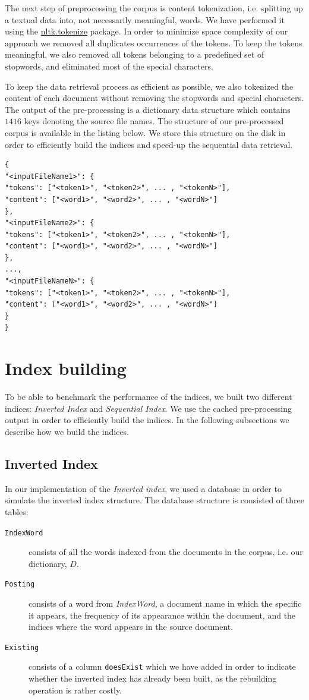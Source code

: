 \documentclass{article}
\begin{document}
The next step of preprocessing the corpus is content tokenization, i.e. splitting up a textual data into, not necessarily meaningful, words. We have performed it using the \href{https://www.nltk.org/}{nltk.tokenize} package. In order to minimize space complexity of our approach we removed all duplicates occurrences of the tokens. To keep the tokens meaningful, we also removed all tokens belonging to a predefined set of stopwords, and eliminated most of the special characters.

To keep the data retrieval process as efficient as possible, we also tokenized the content of each document without removing the stopwords and special characters. The output of the pre-processing is a dictionary data structure which contains $1416$ keys denoting the source file names. The structure of our pre-processed corpus is available in the listing below. We store this structure on the disk in order to efficiently build the indices and speed-up the sequential data retrieval.

\begin{verbatim}
{
"<inputFileName1>": {
"tokens": ["<token1>", "<token2>", ... , "<tokenN>"],
"content": ["<word1>", "<word2>", ... , "<wordN>"]
},
"<inputFileName2>": {
"tokens": ["<token1>", "<token2>", ... , "<tokenN>"],
"content": ["<word1>", "<word2>", ... , "<wordN>"]
},
...,
"<inputFileNameN>": {
"tokens": ["<token1>", "<token2>", ... , "<tokenN>"],
"content": ["<word1>", "<word2>", ... , "<wordN>"]
}
}
\end{verbatim}

\section{Index building}
To be able to benchmark the performance of the indices, we built two different indices: \textit{Inverted Index} and \textit{Sequential Index}. 
We use the cached pre-processing output in order to efficiently build the indices. In the following subsections we describe how we build the indices.

\subsection{Inverted Index}
In our implementation of the \textit{Inverted index}, we used a database in order to simulate the inverted index structure. The database structure is consisted of three tables:
\begin{description}
	\item[\texttt{IndexWord}] consists of all the words indexed from the documents in the corpus, i.e. our dictionary, $D$.
	\item[\texttt{Posting}] consists of a word from \textit{IndexWord}, a document name in which the specific it appears, the frequency of its appearance within the document, and the indices where the word appears in the source document.
	\item[\texttt{Existing}] consists of a column \texttt{doesExist} which we have added in order to indicate whether the inverted index has already been built, as the rebuilding operation is rather costly.
\end{description}
\end{document}
